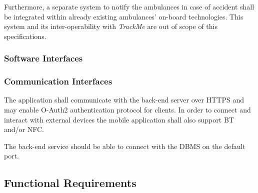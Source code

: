 \documentclass[a4paper]{article}
\begin{document}
        Furthermore, a separate system to notify the ambulances in case of accident shall be integrated within already existing ambulances' on-board technologies. This system and its inter-operability with \textit{TrackMe} are out of scope of this specifications.
        
        \subsubsection{Software Interfaces}

        \subsubsection{Communication Interfaces}
        The application shall communicate with the back-end server over HTTPS and may enable O-Auth2 authentication protocol for clients. In order to connect and interact with external devices the mobile application shall also support BT and/or NFC.
        
        The back-end service should be able to connect with the DBMS on the default port.

    \subsection{Functional Requirements}
\end{document}
